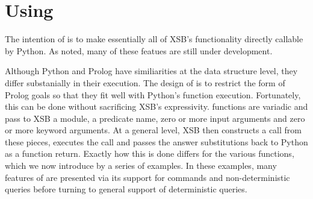 %
%

\section{Using \px}

The intention of \px{} is to make essentially all of XSB's
functionality directly callable by Python.  As noted, many of these
featues are still under development.

Although Python and Prolog have similiarities at the data structure
level, they differ substanially in their execution.  The design of
\px{} is to restrict the form of Prolog goals so that they fit well
with Python's function execution.  Fortunately, this can be done
without sacrificing XSB's expressivity.  \px{} functions are variadic
and pass to XSB a module, a predicate name, zero or more input
arguments and zero or more keyword arguments.  At a general level, XSB
then constructs a call from these pieces, executes the call and passes
the answer substitutions back to Python as a function return. Exactly
how this is done differs for the various \px{} functions, which we now
introduce by a series of examples.  In these examples, many features
of \px{} are presented via its support for commands and
non-deterministic queries before turning to general support of
deterministic queries.

